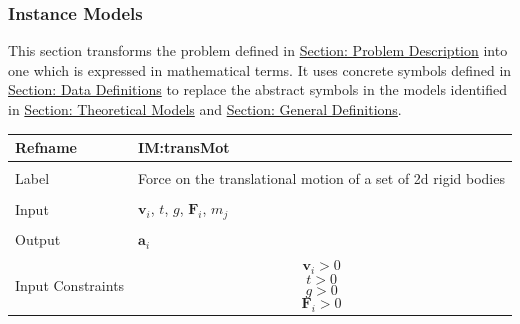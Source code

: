 \documentclass[12pt]{article}
\begin{document}
\subsubsection{Instance Models}
\label{Sec:IMs}
This section transforms the problem defined in \hyperref[Sec:ProbDesc]{Section: Problem Description} into one which is expressed in mathematical terms. It uses concrete symbols defined in \hyperref[Sec:DDs]{Section: Data Definitions} to replace the abstract symbols in the models identified in \hyperref[Sec:TMs]{Section: Theoretical Models} and \hyperref[Sec:GDs]{Section: General Definitions}.
~\newline
 \noindent \begin{minipage}{\textwidth}
\begin{tabular}{p{} p{}}
\toprule \textbf{Refname} & \textbf{IM:transMot}
\label{IM:transMot}
\\ \midrule \\
Label & Force on the translational motion of a set of 2d rigid bodies
        \\ \midrule \\
        Input & ${\mathbf{v}_{i}}$, $t$, $g$, ${\mathbf{F}_{i}}$, ${m_{j}}$
                \\ \midrule \\
                Output & ${\mathbf{a}_{i}}$
                         \\ \midrule \\
                         Input Constraints & \begin{displaymath}
                                             {\mathbf{v}_{i}}>0
                                             \end{displaymath}
                                             \begin{displaymath}
                                             t>0
                                             \end{displaymath}
                                             \begin{displaymath}
                                             g>0
                                             \end{displaymath}
                                             \begin{displaymath}
                                             {\mathbf{F}_{i}}>0
                                             \end{displaymath}
                                             \begin{displaymath}

\end{displaymath}
\end{tabular}
\end{minipage}
\end{document}
